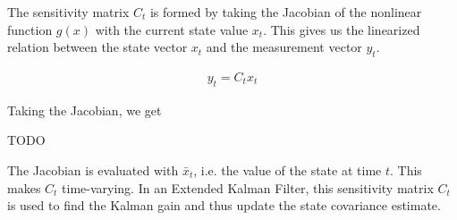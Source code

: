 The sensitivity matrix $C_t$ is formed by taking the Jacobian of the nonlinear function $g(x)$ with the current state value $x_t$. This gives us the linearized relation between the state vector $x_t$ and the measurement vector $y_t$.

\begin{align}
    y_t = C_tx_t
\end{align}

Taking the Jacobian, we get

TODO

The Jacobian is evaluated with $\bar{x}_t$, i.e. the value of the state at time $t$. This makes $C_t$ time-varying. In an Extended Kalman Filter, this sensitivity matrix $C_t$ is used to find the Kalman gain and thus update the state covariance estimate.